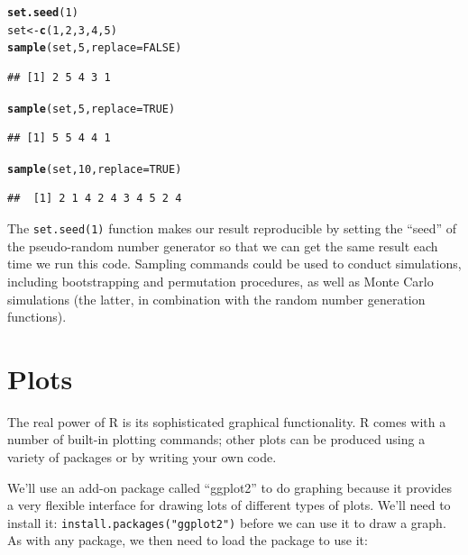 \documentclass[12pt]{article}\usepackage[]{graphicx}\usepackage[]{color}
\makeatletter
\newcommand{\hlnum}[1]{\textcolor[rgb]{0.686,0.059,0.569}{#1}}%
\newcommand{\hlstd}[1]{\textcolor[rgb]{0.345,0.345,0.345}{#1}}%
\newcommand{\hlkwb}[1]{\textcolor[rgb]{0.69,0.353,0.396}{#1}}%
\newcommand{\hlkwc}[1]{\textcolor[rgb]{0.333,0.667,0.333}{#1}}%
\newcommand{\hlkwd}[1]{\textcolor[rgb]{0.737,0.353,0.396}{\textbf{#1}}}%
\newenvironment{kframe}{%
 \def\at@end@of@kframe{}%
 \ifinner\ifhmode%
  \def\at@end@of@kframe{\end{minipage}}%
  \begin{minipage}{\columnwidth}%
 \fi\fi%
 \def\FrameCommand##1{\hskip\@totalleftmargin \hskip-\fboxsep
 \colorbox{shadecolor}{##1}\hskip-\fboxsep
     \hskip-\linewidth \hskip-\@totalleftmargin \hskip\columnwidth}%
 \MakeFramed {\advance\hsize-\width
   \@totalleftmargin\z@ \linewidth\hsize
   \@setminipage}}%
 {\par\unskip\endMakeFramed%
 \at@end@of@kframe}
\newenvironment{knitrout}{}{} %
\makeatother
\begin{document}
\begin{knitrout}
\color{fgcolor}\begin{kframe}
\begin{alltt}
\hlkwd{set.seed}\hlstd{(}\hlnum{1}\hlstd{)}
\hlstd{set}  \hlkwb{<-}  \hlkwd{c}\hlstd{(}\hlnum{1}\hlstd{,}\hlnum{2}\hlstd{,}\hlnum{3}\hlstd{,}\hlnum{4}\hlstd{,}\hlnum{5}\hlstd{)}
\hlkwd{sample}\hlstd{(set,}\hlnum{5}\hlstd{,}\hlkwc{replace}\hlstd{=}\hlnum{FALSE}\hlstd{)}
\end{alltt}
\begin{verbatim}
## [1] 2 5 4 3 1
\end{verbatim}
\begin{alltt}
\hlkwd{sample}\hlstd{(set,}\hlnum{5}\hlstd{,}\hlkwc{replace}\hlstd{=}\hlnum{TRUE}\hlstd{)}
\end{alltt}
\begin{verbatim}
## [1] 5 5 4 4 1
\end{verbatim}
\begin{alltt}
\hlkwd{sample}\hlstd{(set,}\hlnum{10}\hlstd{,}\hlkwc{replace}\hlstd{=}\hlnum{TRUE}\hlstd{)}
\end{alltt}
\begin{verbatim}
##  [1] 2 1 4 2 4 3 4 5 2 4
\end{verbatim}
\end{kframe}
\end{knitrout}

The \texttt{set.seed(1)} function makes our result reproducible by setting the ``seed'' of the pseudo-random number generator so that we can get the same result each time we run this code. Sampling commands could be used to conduct simulations, including bootstrapping and permutation procedures, as well as Monte Carlo simulations (the latter, in combination with the random number generation functions).

\section{Plots}\label{sec:plots}
The real power of R is its sophisticated graphical functionality. R comes with a number of built-in plotting commands; other plots can be produced using a variety of packages or by writing your own code. 

We'll use an add-on package called ``ggplot2'' to do graphing because it provides a very flexible interface for drawing lots of different types of plots. We'll need to install it: \texttt{install.packages("ggplot2")} before we can use it to draw a graph. As with any package, we then need to load the package to use it:
\end{document}
